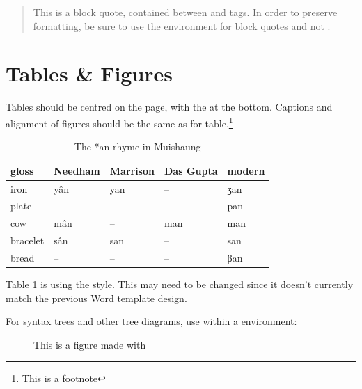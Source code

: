 \begin{quote}
    This is a block quote, contained between  and  tags. In order to preserve formatting, be sure to use the  environment for block quotes and not .
\end{quote}

\lipsum[5]

\section{Tables \& Figures}

\lipsum[6]

Tables should be centred on the page, with the  at the bottom. Captions and alignment of figures should be the same as for table.\footnote{This is a footnote}


\begin{table}[htpb!]
    \centering
    \begin{tabular}{@{}lllll@{}}
    \toprule
    gloss		& Needham	& Marrison	& Das Gupta	& modern \\ \midrule
    iron		& yân		& yan 		& -- 		& ʒan \\
    plate		& ~			& -- 		& -- 		& pan \\
    cow			& mân		& -- 		& man 		& man \\
    bracelet	& sân		& san 		& -- 		& san \\
    bread		& --		& -- 		& -- 		& βan \\ \bottomrule
    \end{tabular}
    \caption{The *an rhyme in Muishaung}
    \label{tab:an}
\end{table}

Table \ref{tab:an} is using the  style. This may need to be changed since it doesn't currently match the previous Word template design.

For syntax trees and other tree diagrams, use  within a  environment:

\begin{figure}[htpb!]
\centering
{}
\caption{This is a figure made with }
\label{firsttree}
\end{figure}

